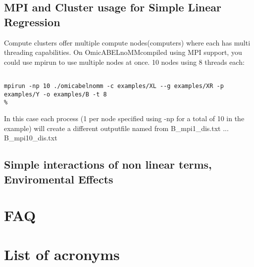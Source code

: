 \documentclass{report}
\newcommand{\oanomm}{OmicABELnoMM}
\begin{document}
\section{\ac{MPI} and Cluster usage for Simple Linear Regression}

Compute clusters offer multiple compute nodes(computers) where each has multi threading capabilities. On \oanomm compiled using \ac{MPI} support, you could use mpirun to use multiple nodes at once. 10 nodes using 8 threads each:

\begin{lstlisting}[escapechar=\%]

mpirun -np 10 ./omicabelnomm -c examples/XL --g examples/XR -p examples/Y -o examples/B -t 8
%
\end{lstlisting}

In this case each process (1 per node specified using -np for a total of 10 in the example) will create a different outputfile named from B\_mpi1\_dis.txt ... B\_mpi10\_dis.txt


\section{Simple interactions of non linear terms, Enviromental Effects}



\chapter{FAQ}

\chapter{List of acronyms}
\label{ch:acro}

\begin{acronym}[BLAS] %
\end{acronym}
\end{document}
